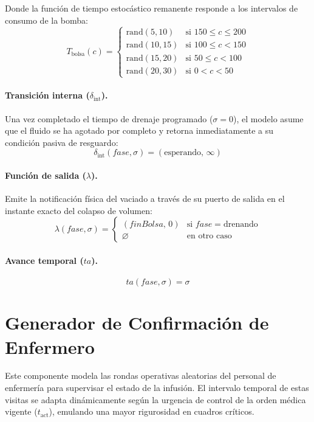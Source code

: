 \documentclass{article}
\newcommand{\dint}{\delta_{\mathrm{int}}}
\begin{document}
Donde la función de tiempo estocástico remanente responde a los intervalos de consumo de la bomba:
\[
  T_{\mathrm{bolsa}}(c) = 
  \begin{cases}
    \text{rand}(5, 10) & \text{si } 150 \le c \le 200 \\[4pt]
    \text{rand}(10, 15) & \text{si } 100 \le c < 150 \\[4pt]
    \text{rand}(15, 20) & \text{si } 50 \le c < 100 \\[4pt]
    \text{rand}(20, 30) & \text{si } 0 < c < 50
  \end{cases}
\]

\paragraph{Transición interna ($\dint$).}
Una vez completado el tiempo de drenaje programado ($\sigma = 0$), el modelo asume que el fluido se ha agotado por completo y retorna inmediatamente a su condición pasiva de resguardo:
\[
  \dint(\mathit{fase}, \sigma) = (\text{esperando},\, \infty)
\]

\paragraph{Función de salida ($\lambda$).}
Emite la notificación física del vaciado a través de su puerto de salida en el instante exacto del colapso de volumen:
\[
  \lambda(\mathit{fase}, \sigma) =
  \begin{cases}
    (\mathit{finBolsa},\, 0) & \text{si } \mathit{fase} = \text{drenando} \\[4pt]
    \varnothing & \text{en otro caso}
  \end{cases}
\]

\paragraph{Avance temporal ($ta$).}
\[
  ta(\mathit{fase}, \sigma) = \sigma
\]


\clearpage
\section{Generador de Confirmación de Enfermero}

Este componente modela las rondas operativas aleatorias del personal de enfermería para supervisar el estado de la infusión. El intervalo temporal de estas visitas se adapta dinámicamente según la urgencia de control de la orden médica vigente ($t_{\mathrm{act}}$), emulando una mayor rigurosidad en cuadros críticos.
\end{document}
